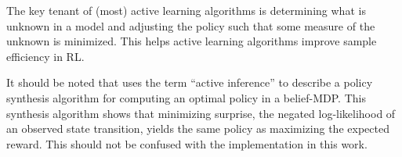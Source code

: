     The key tenant of (most) active learning algorithms is determining what is unknown in a model and adjusting the
    policy such that some measure of the unknown is minimized. This helps active learning algorithms improve sample
    efficiency in \ac{RL}.

    \begin{remark}
        It should be noted that \cite{friston2012active} uses the term ``active inference'' to describe a policy
        synthesis algorithm for computing an optimal policy in a belief-\ac{MDP}. This synthesis algorithm shows that
        minimizing \textnormal{surprise}, the negated log-likelihood of an observed state transition, yields the same
        policy as maximizing the expected reward. This should not be confused with the implementation in this work.
    \end{remark}

